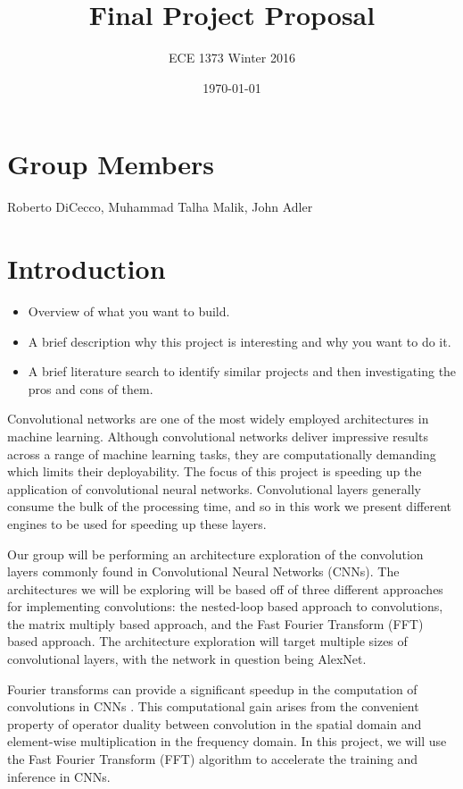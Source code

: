 \documentclass[conference,compsoc]{IEEEtran/IEEEtran}
\title{\bf Final Project Proposal}
\author{ECE 1373 Winter 2016}
\date{\today}
\begin{document}
\maketitle

\section{Group Members}
Roberto DiCecco, Muhammad Talha Malik, John Adler

\section{Introduction}\label{section:intro}
\begin{itemize}
\item Overview of what you want to build.
\item A brief description why this project is interesting and why you want to do it.
\item A brief literature search to identify similar projects and then investigating the pros and cons of them.
\end{itemize}

Convolutional networks are one of the most widely employed architectures in machine learning. Although convolutional networks deliver impressive results across a range of machine learning tasks, they are computationally demanding which limits their deployability. The focus of this project is speeding up the application of convolutional neural networks. Convolutional layers generally consume the bulk of the processing time, and so in this work we present different engines to be used for speeding up these layers.

Our group will be performing an architecture exploration of the convolution layers commonly found in 
Convolutional Neural Networks (CNNs). The architectures we will be exploring will be based off of three
different approaches for implementing convolutions: the nested-loop based approach to convolutions, 
the matrix multiply based approach, and the Fast Fourier Transform (FFT) based approach. The architecture
exploration will target multiple sizes of convolutional layers, with the network in question being AlexNet. 



Fourier transforms can provide a significant speedup in the computation of convolutions in CNNs \cite{FFT1, FFT2}. This computational gain arises from the convenient property of operator duality between convolution in the spatial domain and element-wise multiplication in the frequency domain. In this project, we will use the Fast Fourier Transform (FFT) algorithm to accelerate the training and inference in CNNs.
\end{document}
